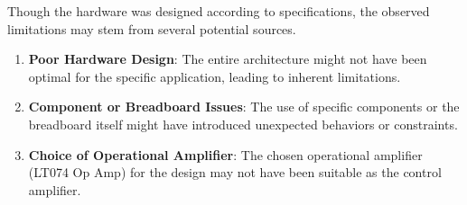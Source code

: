 \documentclass{article}
\begin{document}
Though the hardware was designed according to specifications, the observed limitations may stem from several potential sources.
\begin{enumerate}
\item \textbf{Poor Hardware Design}: The entire architecture might not have been optimal for the specific application, leading to inherent limitations.
\item \textbf{Component or Breadboard Issues}: The use of specific components or the breadboard itself might have introduced unexpected behaviors or constraints.
\item \textbf{Choice of Operational Amplifier}: The chosen operational amplifier (LT074 Op Amp) for the design may not have been suitable as the control amplifier.
\end{enumerate}
\end{document}
